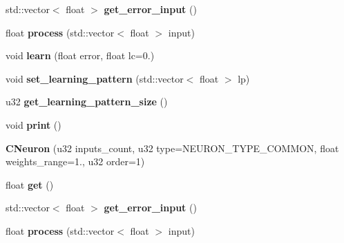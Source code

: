 \begin{DoxyCompactItemize}
\item 
\hypertarget{classCNeuron_a50f6d18278e8fa7cd4d189657b019989}{std\-::vector$<$ float $>$ {\bfseries get\-\_\-error\-\_\-input} ()}\label{classCNeuron_a50f6d18278e8fa7cd4d189657b019989}

\item 
\hypertarget{classCNeuron_a0b9c5ff02de4dae0f2bc98d81810d597}{float {\bfseries process} (std\-::vector$<$ float $>$ input)}\label{classCNeuron_a0b9c5ff02de4dae0f2bc98d81810d597}

\item 
\hypertarget{classCNeuron_a64eb412ce09f2f59077281d86a085303}{void {\bfseries learn} (float error, float lc=0.)}\label{classCNeuron_a64eb412ce09f2f59077281d86a085303}

\item 
\hypertarget{classCNeuron_a0bcb7781406fa9a282eaafe4b154b5b6}{void {\bfseries set\-\_\-learning\-\_\-pattern} (std\-::vector$<$ float $>$ lp)}\label{classCNeuron_a0bcb7781406fa9a282eaafe4b154b5b6}

\item 
\hypertarget{classCNeuron_ad3cfde2fc3314e525345e8ec6595b1cb}{u32 {\bfseries get\-\_\-learning\-\_\-pattern\-\_\-size} ()}\label{classCNeuron_ad3cfde2fc3314e525345e8ec6595b1cb}

\item 
\hypertarget{classCNeuron_a37db8b58d3d3cd00c2cdc12b0a7466b3}{void {\bfseries print} ()}\label{classCNeuron_a37db8b58d3d3cd00c2cdc12b0a7466b3}

\item 
\hypertarget{classCNeuron_ae9f32d41d2bb7b9683a440e038f5b6f6}{{\bfseries C\-Neuron} (u32 inputs\-\_\-count, u32 type=N\-E\-U\-R\-O\-N\-\_\-\-T\-Y\-P\-E\-\_\-\-C\-O\-M\-M\-O\-N, float weights\-\_\-range=1., u32 order=1)}\label{classCNeuron_ae9f32d41d2bb7b9683a440e038f5b6f6}

\item 
\hypertarget{classCNeuron_af97048090878729c7d99dcb8363e61ff}{float {\bfseries get} ()}\label{classCNeuron_af97048090878729c7d99dcb8363e61ff}

\item 
\hypertarget{classCNeuron_a50f6d18278e8fa7cd4d189657b019989}{std\-::vector$<$ float $>$ {\bfseries get\-\_\-error\-\_\-input} ()}\label{classCNeuron_a50f6d18278e8fa7cd4d189657b019989}

\item 
\hypertarget{classCNeuron_a0b9c5ff02de4dae0f2bc98d81810d597}{float {\bfseries process} (std\-::vector$<$ float $>$ input)}\label{classCNeuron_a0b9c5ff02de4dae0f2bc98d81810d597}


\end{DoxyCompactItemize}
